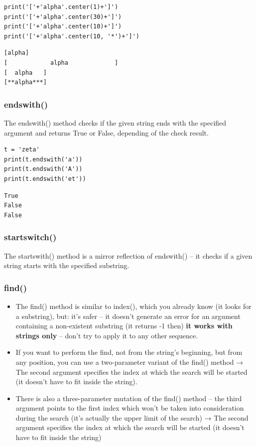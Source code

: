 \documentclass[11pt]{article}
\begin{document}
\begin{verbatim}
print('['+'alpha'.center(1)+']')
print('['+'alpha'.center(30)+']')
print('['+'alpha'.center(10)+']')
print('['+'alpha'.center(10, '*')+']')
\end{verbatim}

\begin{verbatim}
[alpha]
[            alpha             ]
[  alpha   ]
[**alpha***]
\end{verbatim}

\subsubsection{endswith()}
\label{sec:orgf5a7489}
The endswith() method checks if the given string ends with the
specified argument and returns True or False, depending of the check
result.

\begin{verbatim}
t = 'zeta'
print(t.endswith('a'))
print(t.endswith('A'))
print(t.endswith('et'))
\end{verbatim}

\begin{verbatim}
True
False
False
\end{verbatim}

\subsubsection{startswitch()}
\label{sec:orge206ab9}
The startswith() method is a mirror reflection of endswith() ­– it
checks if a given string starts with the specified substring.
\subsubsection{find()}
\label{sec:org063e91b}
\begin{itemize}
\item The find() method is similar to index(), which you already know (it
looks for a substring), but: it’s safer – it doesn’t generate an
error for an argument containing a non-existent substring (it
returns -1 then) \textbf{it works with strings only} – don’t try to apply
it to any other sequence.
\item If you want to perform the find, not from the string’s beginning,
but from any position, you can use a two-parameter variant of the
find() method → The second argument specifies the index at which the
search will be started (it doesn’t have to fit inside the string).
\item There is also a three-parameter mutation of the find() method – the
third argument points to the first index which won’t be taken into
consideration during the search (it’s actually the upper limit of
the search) → The second argument specifies the index at which the
search will be started (it doesn’t have to fit inside the string)
\end{itemize}
\end{document}
